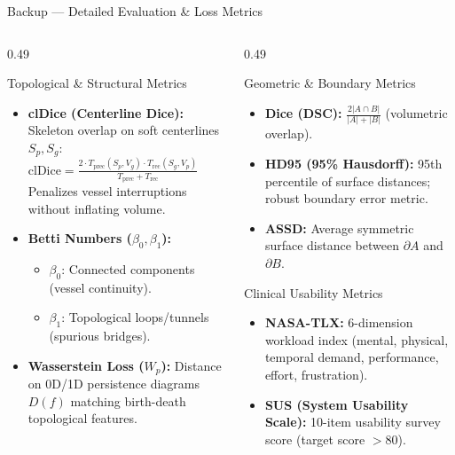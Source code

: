 \documentclass[aspectratio=169,11pt,xcolor=table]{beamer}
\begin{document}
\begin{frame}{Backup --- Detailed Evaluation \& Loss Metrics}
\scriptsize
\begin{columns}[T]
\begin{column}{0.49\linewidth}
\begin{block}{Topological \& Structural Metrics}
  \begin{itemize}
  \setlength\itemsep{1pt}
  \item \textbf{clDice (Centerline Dice):} Skeleton overlap on soft centerlines $S_p, S_g$: \\
    \hfil $\text{clDice} = \frac{2 \cdot T_{\text{prec}}(S_p, V_g) \cdot T_{\text{rec}}(S_g, V_p)}{T_{\text{prec}} + T_{\text{rec}}}$ \\
    Penalizes vessel interruptions without inflating volume.
  \item \textbf{Betti Numbers ($\beta_0, \beta_1$):}
    \begin{itemize}\tiny
    \item $\beta_0$: Connected components (vessel continuity).
    \item $\beta_1$: Topological loops/tunnels (spurious bridges).
    \end{itemize}
  \item \textbf{Wasserstein Loss ($W_p$):} Distance on 0D/1D persistence diagrams $D(f)$ matching birth-death topological features.
  \end{itemize}
\end{block}
\end{column}

\begin{column}{0.49\linewidth}
\begin{block}{Geometric \& Boundary Metrics}
  \begin{itemize}
  \setlength\itemsep{1pt}
  \item \textbf{Dice (DSC):} $\frac{2|A \cap B|}{|A| + |B|}$ (volumetric overlap).
  \item \textbf{HD95 (95\% Hausdorff):} 95th percentile of surface distances; robust boundary error metric.
  \item \textbf{ASSD:} Average symmetric surface distance between $\partial A$ and $\partial B$.
  \end{itemize}
\end{block}

\begin{block}{Clinical Usability Metrics}
  \begin{itemize}
  \setlength\itemsep{1pt}
  \item \textbf{NASA-TLX:} 6-dimension workload index (mental, physical, temporal demand, performance, effort, frustration).
  \item \textbf{SUS (System Usability Scale):} 10-item usability survey score (target score $> 80$).
  \end{itemize}
\end{block}
\end{column}
\end{columns}
\end{frame}
\end{document}
